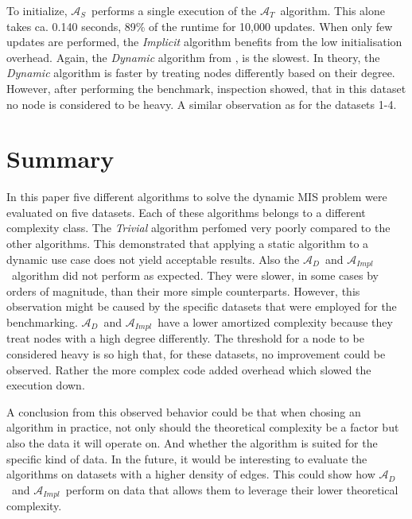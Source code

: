 \documentclass[letterpaper,11pt]{article}
\newcommand{\trivial}{$\mathcal{A}_T$\ }
\newcommand{\simple}{$\mathcal{A}_S$\ }
\newcommand{\dynamic}{$\mathcal{A}_{D}$\ }
\newcommand{\implicit}{$\mathcal{A}_{Impl}$\ }
\begin{document}
To initialize, \simple performs a single execution of the
\trivial algorithm. This alone takes ca. 0.140 seconds, 89\% of the
runtime for 10,000 updates. When only few updates are performed, the
\textit{Implicit} algorithm benefits from the low initialisation overhead.
Again, the \textit{Dynamic} algorithm from \cite{gupta2018simple}, is the
slowest. In theory, the \textit{Dynamic} algorithm is faster by treating nodes
differently based on their degree. However, after performing the benchmark,
inspection showed, that in this dataset no node is considered to be heavy.
A similar observation as for the datasets 1-4.





\section{Summary}
\label{Summary}

In this paper five different algorithms to solve the dynamic MIS problem
were evaluated on five datasets. Each of these algorithms belongs to a different
complexity class.
The \textit{Trivial} algorithm perfomed very poorly compared to the other algorithms.
This demonstrated that applying a static algorithm to a dynamic use case
does not yield acceptable results.
Also the \dynamic and \implicit algorithm did not perform as expected. They were
slower, in some cases by orders of magnitude, than their more simple counterparts.
However, this observation might be caused by the specific datasets that were employed
for the benchmarking. \dynamic and \implicit have a lower amortized complexity because
they treat nodes with a high degree differently. The threshold for a node to be
considered heavy is so high that, for these datasets, no improvement could
be observed. Rather the more complex code added overhead which slowed the execution
down.

A conclusion from this observed behavior could be that when chosing an algorithm
in practice, not only should the theoretical complexity be a factor but also the
data it will operate on. And whether the algorithm is suited for the specific
kind of data. In the future, it would be interesting to evaluate the algorithms
on datasets with a higher density of edges. This could show how \dynamic and
\implicit perform on data that allows them to leverage their lower theoretical
complexity.


{}

\end{document}
